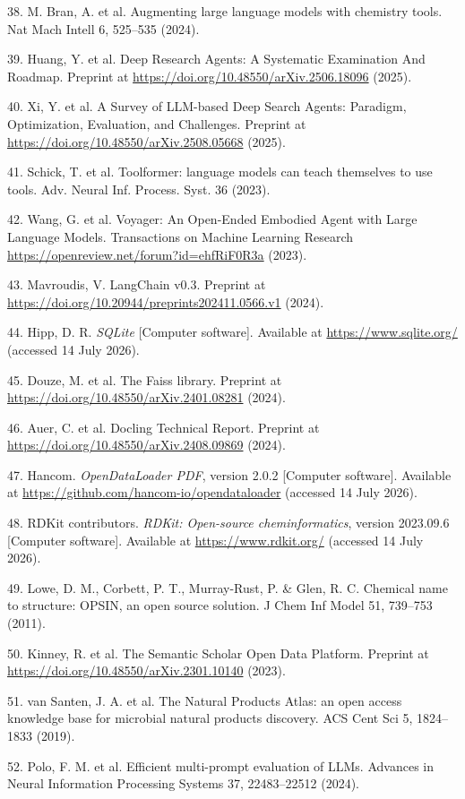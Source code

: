\documentclass[
]{article}
\begin{document}
38. M. Bran, A. et al. Augmenting large language models with chemistry tools. Nat Mach Intell 6, 525--535 (2024).

39. Huang, Y. et al. Deep Research Agents: A Systematic Examination And Roadmap. Preprint at \url{https://doi.org/10.48550/arXiv.2506.18096} (2025).

40. Xi, Y. et al. A Survey of LLM-based Deep Search Agents: Paradigm, Optimization, Evaluation, and Challenges. Preprint at \url{https://doi.org/10.48550/arXiv.2508.05668} (2025).

41. Schick, T. et al. Toolformer: language models can teach themselves to use tools. Adv. Neural Inf. Process. Syst. 36 (2023).

42. Wang, G. et al. Voyager: An Open-Ended Embodied Agent with Large Language Models. Transactions on Machine Learning Research \url{https://openreview.net/forum?id=ehfRiF0R3a} (2023).

43. Mavroudis, V. LangChain v0.3. Preprint at \url{https://doi.org/10.20944/preprints202411.0566.v1} (2024).

44. Hipp, D. R. \emph{SQLite} [Computer software]. Available at \url{https://www.sqlite.org/} (accessed 14 July 2026).

45. Douze, M. et al. The Faiss library. Preprint at \url{https://doi.org/10.48550/arXiv.2401.08281} (2024).

46. Auer, C. et al. Docling Technical Report. Preprint at \url{https://doi.org/10.48550/arXiv.2408.09869} (2024).

47. Hancom. \emph{OpenDataLoader PDF}, version 2.0.2 [Computer software]. Available at \url{https://github.com/hancom-io/opendataloader} (accessed 14 July 2026).

48. RDKit contributors. \emph{RDKit: Open-source cheminformatics}, version 2023.09.6 [Computer software]. Available at \url{https://www.rdkit.org/} (accessed 14 July 2026).

49. Lowe, D. M., Corbett, P. T., Murray-Rust, P. \& Glen, R. C. Chemical name to structure: OPSIN, an open source solution. J Chem Inf Model 51, 739--753 (2011).

50. Kinney, R. et al. The Semantic Scholar Open Data Platform. Preprint at \url{https://doi.org/10.48550/arXiv.2301.10140} (2023).

51. van Santen, J. A. et al. The Natural Products Atlas: an open access knowledge base for microbial natural products discovery. ACS Cent Sci 5, 1824--1833 (2019).

52. Polo, F. M. et al. Efficient multi-prompt evaluation of LLMs. Advances in Neural Information Processing Systems 37, 22483--22512 (2024).
\end{document}
